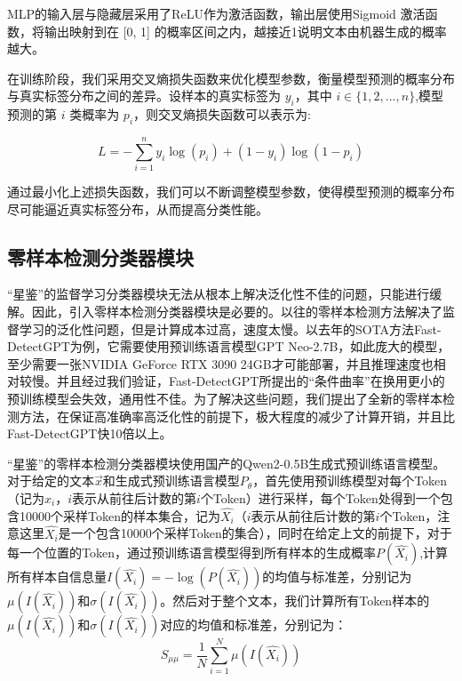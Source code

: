 \documentclass[a4paper]{report}
\begin{document}
MLP的输入层与隐藏层采用了ReLU作为激活函数，输出层使用Sigmoid 激活函数，将输出映射到在 [0, 1] 的概率区间之内，越接近1说明文本由机器生成的概率越大。

在训练阶段，我们采用交叉熵损失函数来优化模型参数，衡量模型预测的概率分布与真实标签分布之间的差异。设样本的真实标签为 $y_i$，其中 $i \in \{1, 2, ..., n\}$,模型预测的第 $i$ 类概率为 $p_i$，则交叉熵损失函数可以表示为:

\begin{equation}
	L = -\sum_{i=1}^n y_i \log(p_i) + (1 - y_i) \log(1 - p_i)
\end{equation}

通过最小化上述损失函数，我们可以不断调整模型参数，使得模型预测的概率分布尽可能逼近真实标签分布，从而提高分类性能。


\subsection{零样本检测分类器模块}

“星鉴”的监督学习分类器模块无法从根本上解决泛化性不佳的问题，只能进行缓解。因此，引入零样本检测分类器模块是必要的。以往的零样本检测方法解决了监督学习的泛化性问题，但是计算成本过高，速度太慢。以去年的SOTA方法Fast-DetectGPT为例，它需要使用预训练语言模型GPT Neo-2.7B，如此庞大的模型，至少需要一张NVIDIA GeForce RTX 3090 24GB才可能部署，并且推理速度也相对较慢。并且经过我们验证，Fast-DetectGPT所提出的“条件曲率”在换用更小的预训练模型会失效，通用性不佳。为了解决这些问题，我们提出了全新的零样本检测方法，在保证高准确率高泛化性的前提下，极大程度的减少了计算开销，并且比Fast-DetectGPT快10倍以上。

“星鉴”的零样本检测分类器模块使用国产的Qwen2-0.5B生成式预训练语言模型。对于给定的文本$\vec{x}$和生成式预训练语言模型$P_{\theta}$，首先使用预训练模型对每个Token（记为$x_i$，$i$表示从前往后计数的第$i$个Token）进行采样，每个Token处得到一个包含10000个采样Token的样本集合，记为$\hat{X_i}$（$i$表示从前往后计数的第$i$个Token，注意这里$\hat{X_i}$是一个包含10000个采样Token的集合），同时在给定上文的前提下，对于每一个位置的Token，通过预训练语言模型得到所有样本的生成概率$P(\hat{X_i})$,计算所有样本自信息量$I(\hat{X_i})=-\log(P(\hat{X_i}))$的均值与标准差，分别记为$\mu(I(\hat{X_i}))$和$\sigma(I(\hat{X_i}))$。然后对于整个文本，我们计算所有Token样本的$\mu(I(\hat{X_i}))$和$\sigma(I(\hat{X_i}))$对应的均值和标准差，分别记为：
\begin{equation}
	S_{\mu\mu} = \frac{1}{N} \sum_{i=1}^N \mu(I(\hat{X_i}))
\end{equation}
\end{document}
